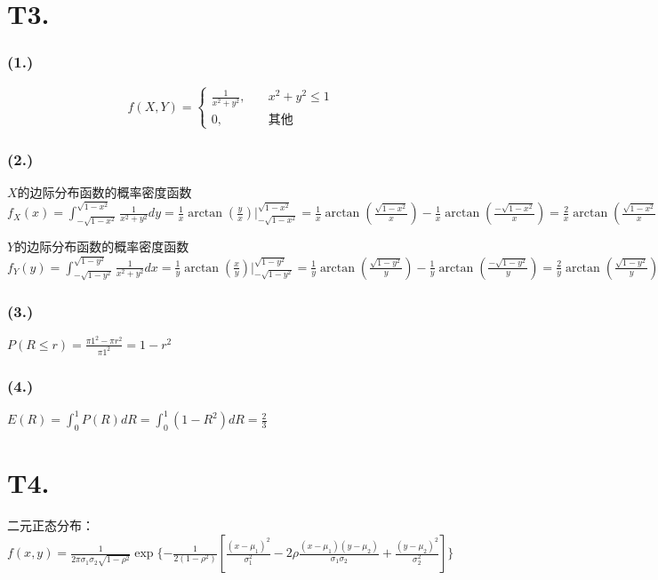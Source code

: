 \documentclass{article}
\newcommand\f[2]{\frac{#1}{#2}}
\begin{document}
\section*{T3. }

\subsubsection*{(1.)}

\[
    f(X,Y)=
    \begin{cases}
        \f{1}{x^2+y^2}, &\quad x^2+y^2\leq1\\
        0, &\quad \text{其他}
    \end{cases}
\]

\subsubsection*{(2.)}

$X$的边际分布函数的概率密度函数$f_X(x)=\int_{-\sqrt{1-x^2}}^{\sqrt{1-x^2}}\f{1}{x^2+y^2}dy=\f{1}{x}\arctan(\f{y}{x})|_{-\sqrt{1-x^2}}^{\sqrt{1-x^2}}=\f{1}{x}\arctan(\f{\sqrt{1-x^2}}{x})-\f{1}{x}\arctan(\f{-\sqrt{1-x^2}}{x})=\f{2}{x}\arctan(\f{\sqrt{1-x^2}}{x})$

$Y$的边际分布函数的概率密度函数$f_Y(y)=\int_{-\sqrt{1-y^2}}^{\sqrt{1-y^2}}\f{1}{x^2+y^2}dx=\f{1}{y}\arctan(\f{x}{y})|_{-\sqrt{1-y^2}}^{\sqrt{1-y^2}}=\f{1}{y}\arctan(\f{\sqrt{1-y^2}}{y})-\f{1}{y}\arctan(\f{-\sqrt{1-y^2}}{y})=\f{2}{y}\arctan(\f{\sqrt{1-y^2}}{y})$

\subsubsection*{(3.)}

$P(R \leq r)=\f{\pi 1^2 -\pi r^2}{\pi 1^2}=1-r^2$

\subsubsection*{(4.)}

$E(R)=\int_0^1P(R)dR=\int_0^1(1-R^2)dR=\f{2}{3}$

\section*{T4. }

二元正态分布：$f(x,y)=\f{1}{2\pi\sigma_1\sigma_2\sqrt{1-\rho^2}}\exp\{-\f{1}{2(1-\rho^2)}[\f{(x-\mu_1)^2}{\sigma_1^2}-2\rho\f{(x-\mu_1)(y-\mu_2)}{\sigma_1\sigma_2}+\f{(y-\mu_2)^2}{\sigma_2^2}]\}$
\end{document}
